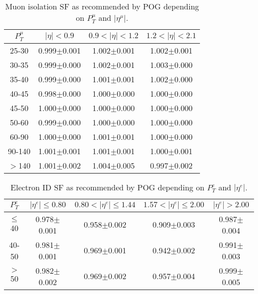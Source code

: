 \begin{table}[h]
  \footnotesize
  \begin{center}
  \caption{Muon isolation SF as recommended by POG depending on $P_T^{\mu}$ and $|\eta^{\mu}|$.} 
   \begin{tabular}{|c|c|c|c|}
\hline
 $P_T^{\mu}$  & $|\eta|< 0.9$   & $0.9<|\eta|< 1.2$    & $1.2<|\eta|< 2.1$ \\ \hline
25-30          & 0.999$\pm$0.001   & 1.002$\pm$0.001    & 1.002$\pm$0.001     \\ \hline
30-35          & 0.999$\pm$0.000   & 1.002$\pm$0.001    & 1.003$\pm$0.000        \\ \hline
35-40          & 0.999$\pm$0.000   & 1.001$\pm$0.001    & 1.002$\pm$0.000        \\ \hline
40-45          & 0.998$\pm$0.000   & 1.000$\pm$0.000    & 1.000$\pm$0.000        \\ \hline
45-50          & 1.000$\pm$0.000   & 1.000$\pm$0.000    & 1.000$\pm$0.000        \\ \hline
50-60          & 0.999$\pm$0.000   & 1.000$\pm$0.000    & 1.000$\pm$0.000        \\ \hline
60-90          & 1.000$\pm$0.000   & 1.001$\pm$0.001    & 1.000$\pm$0.000        \\ \hline
90-140         & 1.001$\pm$0.001   & 1.001$\pm$0.001    & 1.000$\pm$0.001        \\ \hline
$>$140         & 1.001$\pm$0.002   & 1.004$\pm$0.005    & 0.997$\pm$0.002        \\ \hline
  \end{tabular}
  \label{tab:SFs_MuonIso}
  \end{center}
\end{table}

\begin{table}[h]
  \footnotesize
  \begin{center}
  \caption{Electron ID SF as recommended by POG depending on $P_T^{e}$ and $|\eta^{e}|$.} 
   \begin{tabular}{|c|c|c|c|c|}
\hline
 $P_T^{e}$  & $|\eta^{e}|\leq 0.80$ & $0.80<|\eta^{e}|\leq 1.44$ & $1.57<|\eta^{e}|\leq 2.00$ & $|\eta^{e}|> 2.00$\\ \hline
$\leq$40       & 0.978$\pm$0.001   & 0.958$\pm$0.002        & 0.909$\pm$0.003        & 0.987$\pm$0.004 \\ \hline
40-50          & 0.981$\pm$0.001   & 0.969$\pm$0.001        & 0.942$\pm$0.002        & 0.991$\pm$0.003 \\ \hline
$>$50            & 0.982$\pm$0.002   & 0.969$\pm$0.002        & 0.957$\pm$0.004        & 0.999$\pm$0.005 \\ \hline
  \end{tabular}
  \label{tab:SFs_ElectronID}
  \end{center}
\end{table}

